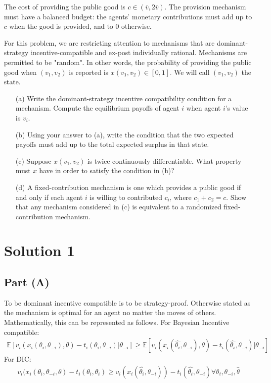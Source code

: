 \documentclass[10pt,a4paper]{article}
\begin{document}
  The cost of providing the public good is $c \in (\bar{v}, 2\bar{v})$. The provision mechanism must have a balanced budget: the agents' monetary contributions must add up to $c$ when the good is provided, and to 0 otherwise.

  For this problem, we are restricting attention to mechanisms that are dominant-strategy incentive-compatible and ex-post individually rational. Mechanisms are permitted to be "random". In other words, the probability of providing the public good when $(v_1, v_2)$ is reported is $x(v_1, v_2) \in [0, 1]$. We will call $(v_1, v_2)$ the state.

  \begin{enumerate}
      \item[(a)] Write the dominant-strategy incentive compatibility condition for a mechanism. Compute the equilibrium payoffs of agent $i$ when agent $i$'s value is $v_i$.
      \item[(b)] Using your answer to (a), write the condition that the two expected payoffs must add up to the total expected surplus in that state.
      \item[(c)] Suppose $x(v_1, v_2)$ is twice continuously differentiable. What property must $x$ have in order to satisfy the condition in (b)?
      \item[(d)] A fixed-contribution mechanism is one which provides a public good if and only if each agent $i$ is willing to contributed $c_i$, where $c_1 + c_2 = c$. Show that any mechanism considered in (c) is equivalent to a randomized fixed-contribution mechanism.
  \end{enumerate}

\section*{Solution 1}
  \subsection*{Part (A)}
    To be dominant incentive compatible is to be strategy-proof. Otherwise stated as the mechanism is optimal for an agent no matter the moves of others. Mathematically, this can be represented as follows. For Bayesian Incentive compatible:
    \begin{gather*}
      \mathbb{E}[v_i(x_i(\theta_i, \theta_{-i}),\theta) - t_i(\theta_i,\theta_{-i})|\theta_{-i}] \geq \mathbb{E}[v_i(x_i(\hat{\theta_i}, \theta_{-i}),\theta) - t_i(\hat{\theta_i},\theta_{-i})|\theta_{-i}]
    \end{gather*}
    For DIC:
    \begin{gather*}
      v_i(x_i(\theta_i,\theta_{-i},\theta) - t_i(\theta_i,\theta_{i}) \geq v_i(x_i(\hat{\theta_i},\theta_{-i})) - t_i(\hat{\theta_i},\theta_{-i}) \forall \theta_i, \theta_{-i}, \hat{\theta}
    \end{gather*}
\end{document}
